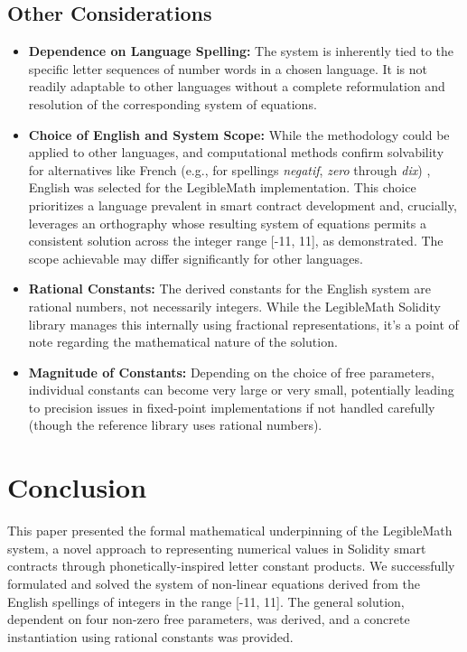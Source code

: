 \documentclass[12pt,a4paper]{article}
\theoremstyle{plain}
\theoremstyle{definition}
\begin{document}
\subsection{Other Considerations}
\begin{itemize}
    \item \textbf{Dependence on Language Spelling:} The system is inherently tied to the specific letter sequences of number words in a chosen language. It is not readily adaptable to other languages without a complete reformulation and resolution of the corresponding system of equations.

    \item \textbf{Choice of English and System Scope:} While the methodology could be applied to other languages, and computational methods confirm solvability for alternatives like French (e.g., for spellings \emph{negatif}, \emph{zero} through \emph{dix}) \cite{raffy_french}, English was selected for the LegibleMath implementation. This choice prioritizes a language prevalent in smart contract development and, crucially, leverages an orthography whose resulting system of equations permits a consistent solution across the integer range [-11, 11], as demonstrated. The scope achievable may differ significantly for other languages.

    \item \textbf{Rational Constants:} The derived constants for the English system are rational numbers, not necessarily integers. While the LegibleMath Solidity library manages this internally using fractional representations, it's a point of note regarding the mathematical nature of the solution.

    \item \textbf{Magnitude of Constants:} Depending on the choice of free parameters, individual constants can become very large or very small, potentially leading to precision issues in fixed-point implementations if not handled carefully (though the reference library uses rational numbers).
\end{itemize}

\section{Conclusion}
\label{sec:conclusion}

This paper presented the formal mathematical underpinning of the LegibleMath system, a novel approach to representing numerical values in Solidity smart contracts through phonetically-inspired letter constant products. We successfully formulated and solved the system of non-linear equations derived from the English spellings of integers in the range [-11, 11]. The general solution, dependent on four non-zero free parameters, was derived, and a concrete instantiation using rational constants was provided.
\end{document}
